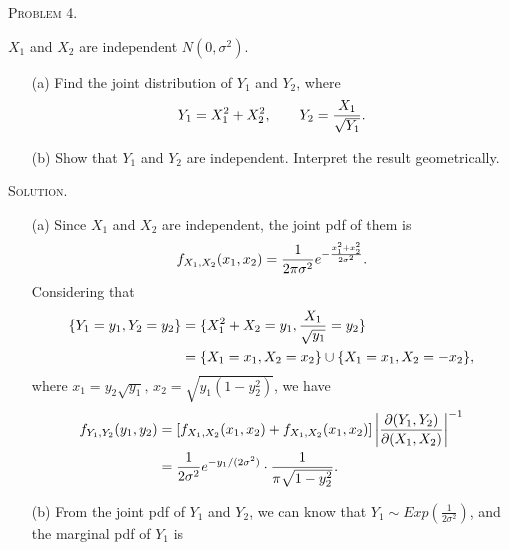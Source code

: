 \documentclass{article}
\begin{document}
\begin{CJK}{UTF8}{gbsn}
    \begin{shaded}
        \noindent\textsc{Problem 4.}\par
        $X_1$ and $X_2$ are independent $N(0, \sigma^2)$.
        \begin{itemize}
            \item [(a)] Find the joint distribution of $Y_1$ and $Y_2$, where
                  \begin{align}
                      Y_1 = X_1^2+X_2^2,\qquad Y_2=\frac{X_1}{\sqrt{Y_1}}.\notag
                  \end{align}
            \item [(b)] Show that $Y_1$ and $Y_2$ are independent. Interpret the result geometrically.
        \end{itemize}
    \end{shaded}
    \noindent\textsc{Solution.}\par
    \begin{itemize}
        \item [(a)]
              Since $X_1$ and $X_2$ are independent, the joint pdf of them is
              \begin{align}
                  f_{X_1,X_2}(x_1,x_2) = \frac{1}{2\pi \sigma^2}e^{-\frac{x_1^2 + x_2^2}{2\sigma^2}}.\notag
              \end{align}
              Considering that
              \begin{align}
                  \{ Y_1=y_1, Y_2 = y_2\} & = \{X_1^2 + X_2 = y_1,\frac{X_1}{\sqrt{y_1}}=y_2\}\notag   \\
                                          & = \{X_1=x_1, X_2=x_2 \} \cup \{X_1=x_1, X_2=-x_2 \},\notag
              \end{align}
              where $x_1 = y_2\sqrt{y_1},\, x_2=\sqrt{y_1(1-y_2^2)}$,
              we have
              \begin{align}
                  f_{Y_1,Y_2}(y_1,y_2) & =\left [ f_{X_1,X_2}(x_1,x_2) + f_{X_1,X_2}(x_1,x_2) \right ] \left | \frac{\partial (Y_1,Y_2)}{\partial (X_1, X_2)}  \right |^{-1}\notag \\
                                       & = \frac{1}{2\sigma^2}e^{-y_1/ (2\sigma^2) }\cdot \frac{1}{\pi \sqrt{1-y_2^2}}.\notag
              \end{align}
        \item [(b)]
              From the joint pdf of $Y_1$ and $Y_2$, we can know that $Y_1\sim Exp(\frac{1}{2\sigma^2})$, and the
              marginal pdf of $Y_1$ is
              \begin{align}

\end{align}
\end{itemize}
\end{CJK}
\end{document}
